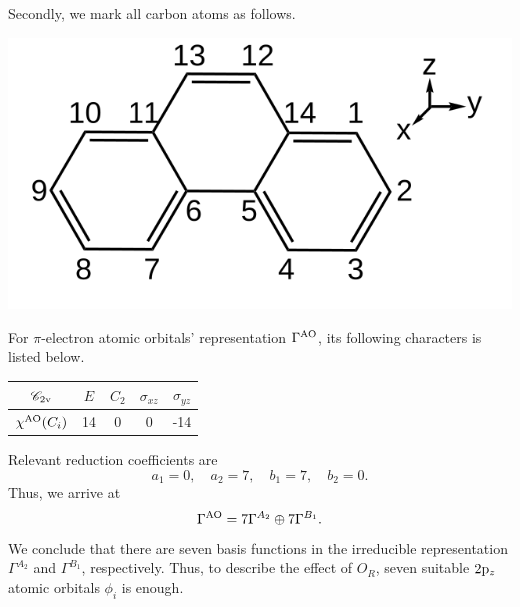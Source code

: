 \documentclass[a4paper]{book}
\newcommand{\AO}{{\rm AO}}
\newcommand{\orb}[1]{{\rm #1}}
\newcommand{\orbp}{\orb{p}}
\begin{document}
\begin{solution}
\begin{enumerate}[label=(\alph*)]
		Secondly, we mark all carbon atoms as follows.
		\begin{center}
		\includegraphics[scale=1.0]{./structures/exercise_1/phenanthrene/0.png}
		\setlength{\abovecaptionskip}{-0.3em}
		\setlength{\belowcaptionskip}{-0.8em}
		\end{center}				
		
		For $\pi$-electron atomic orbitals' representation $\Gamma^{\rm AO}$, its following characters is listed below.
		\begin{center}
		\setlength{\abovecaptionskip}{-0.3em}
		\begin{tabular}{ccccc}\hline
	$\mathscr{C}_{\rm 2v}$	& $E$ & $C_2$ &	$\sigma_{xz}$	& $\sigma_{yz}$ \\ \hline
	$\chi^{\AO}(C_i)$	&	14	&	0	&	0	&	-14	\\ \hline
		\end{tabular}\vspace*{-0.5em}
		\end{center}
		Relevant reduction coefficients are
		\begin{equation*}
		a_1 = 0, \quad a_2 = 7, \quad b_1 = 7, \quad b_2 = 0.
		\end{equation*}
		Thus, we arrive at
		\begin{equation*}
			\Gamma^{\AO} = 7\Gamma^{A_2} \oplus 7\Gamma^{B_1}.
		\end{equation*}
		We conclude that there are seven basis functions in the irreducible representation $\Gamma^{A_2}$ and $\Gamma^{B_1}$, respectively. Thus, to describe the effect of $O_R$, seven suitable $2 \orbp_z$ atomic orbitals $\phi_i$ is enough.
		

\end{enumerate}
\end{solution}
\end{document}
